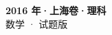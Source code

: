 \documentclass[zihao=-4, a4paper]{ctexart}
\begin{document}
\begin{center}
  {\Large\bfseries 2016 年·上海卷·理科}\\[4pt]
  {\large 数学 · 试题版}
\end{center}
\medskip
{}

\end{document}
